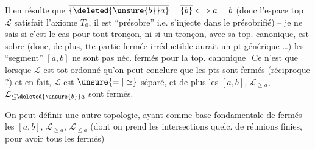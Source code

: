 Il en résulte que $\overline{\{\deleted{\unsure{b}}a\}}=\overline{\{b\}}\Longleftrightarrow a=b$ (donc l'espace top $\mathcal L$ satisfait l'axiome $T_0$, il est ``présobre'' i.e. s'injecte dans le présobrifié) -- je ne sais si c'est
le cas pour tout tronçon, ni si un tronçon, avec sa top. canonique, est sobre (donc, de plus, tte partie fermée \uline{irréductible} aurait un pt générique \dots)
les ``segment'' $[a,b]$ ne sont pas néc. fermés pour la top. canonique$^{\dagger}$
Ce n'est que lorsque $\mathcal L$ est \uline{tot} ordonné qu'on peut conclure que les pts sont fermés (réciproque ?) et en fait, $\mathcal L$ est $\unsure{=|\simeq}$ \uline{séparé}, et de plus les $[a,b]$, $\mathcal L_{\geq a}$, $\mathcal L_{\leq\deleted{\unsure{b}}a}$ sont fermés.

On peut définir une autre topologie, ayant comme base fondamentale de fermés les $[a,b]$, $\mathcal L_{\geq a}$, $\mathcal L_{\leq a}$ (dont on prend les intersections quelc. de réunions finies, pour avoir tous les fermés)

